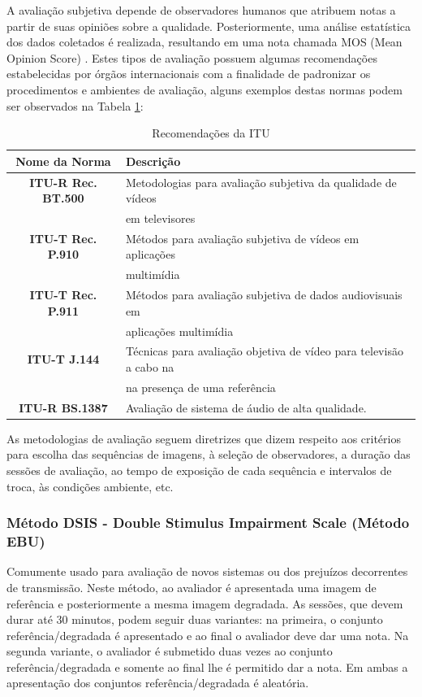 A avaliação subjetiva depende de observadores humanos que atribuem notas a partir de suas opiniões sobre a qualidade. Posteriormente, uma análise estatística dos dados coletados é realizada, resultando em uma nota chamada MOS (Mean Opinion Score) \cite{itup930} \cite{albini}. Estes tipos de avaliação possuem algumas recomendações estabelecidas por órgãos internacionais com a finalidade de padronizar os procedimentos e ambientes de avaliação, alguns exemplos destas normas podem ser observados na Tabela \ref{tab:recomendacoes}:

\begin{table}
	\centering
	\caption{Recomendações da ITU}
	\label{tab:recomendacoes}
	\begin{tabular}{c|l}
		\hline
		\textbf{Nome da Norma} & Descrição \\
		\hline
		\textbf{ITU-R Rec. BT.500} & Metodologias para avaliação subjetiva da qualidade de vídeos \\
			& em televisores \\
		\textbf{ITU-T Rec. P.910} & Métodos para avaliação subjetiva de vídeos em aplicações \\
			& multimídia \\
		\textbf{ITU-T Rec. P.911} & Métodos para avaliação subjetiva de dados audiovisuais em \\
			& aplicações multimídia \\
		\textbf{ITU-T J.144} & Técnicas para avaliação objetiva de vídeo para televisão a cabo na \\
			& na presença de uma referência \\
		\textbf{ITU-R BS.1387} & Avaliação de sistema de áudio de alta qualidade. \\
		\hline
	\end{tabular}
\end{table}

As metodologias de avaliação seguem diretrizes que dizem respeito aos critérios para escolha das sequências de imagens, à seleção de observadores, a duração das sessões de avaliação, ao tempo de exposição de cada sequência e intervalos de troca, às condições ambiente, etc.

\subsubsection{Método DSIS - Double Stimulus Impairment Scale (Método EBU)}

Comumente usado para avaliação de novos sistemas ou dos prejuízos decorrentes de transmissão. Neste método, ao avaliador é apresentada uma imagem de referência e posteriormente a mesma imagem degradada. As sessões, que devem durar até 30 minutos, podem seguir duas variantes: na primeira, o conjunto referência/degradada é apresentado e ao final o avaliador deve dar uma nota. Na segunda variante, o avaliador é submetido duas vezes ao conjunto referência/degradada e somente ao final lhe é permitido dar a nota. Em ambas a apresentação dos conjuntos referência/degradada é aleatória.

